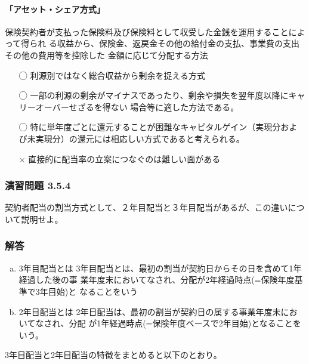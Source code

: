 \documentclass[report,gutter=10mm,fore-edge=10mm,uplatex,dvipdfmx]{jlreq}
\begin{document}
\paragraph{「アセット・シェア方式」}
保険契約者が支払った保険料及び保険料として収受した金銭を運用することによって得られ
る収益から、保険金、返戻金その他の給付金の支払、事業費の支出その他の費用等を控除した
金額に応じて分配する方法

\begin{itemize}
 \item [◯] 利源別ではなく総合収益から剰余を捉える方式
 \item [◯] 一部の利源の剰余がマイナスであったり、剰余や損失を翌年度以降にキャリーオーバーせざるを得ない
場合等に適した方法である。
 \item [◯] 特に単年度ごとに還元することが困難なキャピタルゲイン（実現分および未実現分）の還元には相応しい方式であると考えられる。
 \item [×] 直接的に配当率の立案につなぐのは難しい面がある
\end{itemize}

\subsubsection{演習問題 3.5.4}
契約者配当の割当方式として、２年目配当と３年目配当があるが、この違いについて説明せよ。
\subsubsection{解答}

\begin{enumerate} [(a)]
 \item  3年目配当とは
 3年目配当とは、最初の割当が契約日からその日を含めて1年経過した後の事
 業年度末においてなされ、分配が2年経過時点(=保険年度基準で3年目始)と
 なることをいう
 \item  2年目配当とは
 2年日配当は、最初の割当が契約日の属する事業年度末においてなされ、分配
 が1年経過時点(=保険年度ベースで2年目始)となることをいう。
\end{enumerate}

3年目配当と2年目配当の特徴をまとめると以下のとおり。
\end{document}
